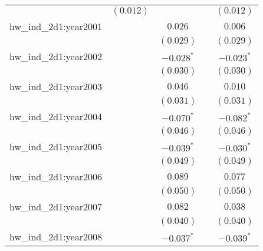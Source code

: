 \begin{center}
\begin{longtable}{l c c c c}
                         & $(0.012)$             &                       &                       & $(0.012)$             \\
hw\_ind\_2d1:year2001    &                       & $0.026$               &                       & $0.006$               \\
                         &                       & $(0.029)$             &                       & $(0.029)$             \\
hw\_ind\_2d1:year2002    &                       & $\mathbf{-0.028}^{*}$ &                       & $\mathbf{-0.023}^{*}$ \\
                         &                       & $(0.030)$             &                       & $(0.030)$             \\
hw\_ind\_2d1:year2003    &                       & $0.046$               &                       & $0.010$               \\
                         &                       & $(0.031)$             &                       & $(0.031)$             \\
hw\_ind\_2d1:year2004    &                       & $\mathbf{-0.070}^{*}$ &                       & $\mathbf{-0.082}^{*}$ \\
                         &                       & $(0.046)$             &                       & $(0.046)$             \\
hw\_ind\_2d1:year2005    &                       & $\mathbf{-0.039}^{*}$ &                       & $\mathbf{-0.030}^{*}$ \\
                         &                       & $(0.049)$             &                       & $(0.049)$             \\
hw\_ind\_2d1:year2006    &                       & $0.089$               &                       & $0.077$               \\
                         &                       & $(0.050)$             &                       & $(0.050)$             \\
hw\_ind\_2d1:year2007    &                       & $0.082$               &                       & $0.038$               \\
                         &                       & $(0.040)$             &                       & $(0.040)$             \\
hw\_ind\_2d1:year2008    &                       & $\mathbf{-0.037}^{*}$ &                       & $\mathbf{-0.039}^{*}$ \\

\end{longtable}
\end{center}
